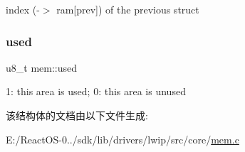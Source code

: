index (-\/$>$ ram\mbox{[}prev\mbox{]}) of the previous struct \mbox{\label{structmem_aa76b6a39425617435978dce903f0d456}} 
\subsubsection{\texorpdfstring{used}{used}}
{\footnotesize\ttfamily u8\+\_\+t mem\+::used}

1\+: this area is used; 0\+: this area is unused 

该结构体的文档由以下文件生成\+:\begin{DoxyCompactItemize}
\item 
E\+:/\+React\+O\+S-\/0../sdk/lib/drivers/lwip/src/core/\hyperlink{sdk_2lib_2drivers_2lwip_2src_2core_2mem_8c}{mem.\+c}\end{DoxyCompactItemize}
